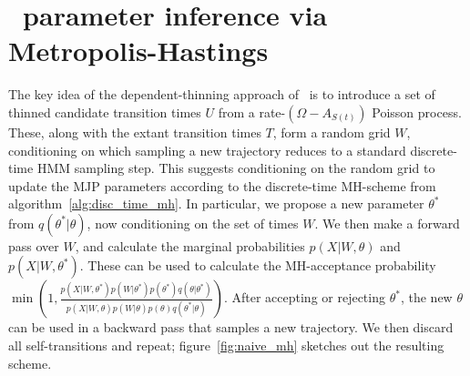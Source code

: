 \section{\Naive\ parameter inference via Metropolis-Hastings}

The key idea of the dependent-thinning approach of~\cite{RaoTeh13} is
to introduce a set of thinned candidate transition times $U$ from
a rate-$(\Omega-A_{S(t)})$ Poisson process. These, along 
with the extant transition times $T$, form a random grid $W$, conditioning on
which sampling a new trajectory reduces to a standard discrete-time 
HMM sampling step. This suggests conditioning on the random grid to update
the MJP parameters according to the discrete-time MH-scheme from
algorithm~\ref{alg:disc_time_mh}.
In particular, we propose a new parameter $\theta^*$ from $q(\theta^*|\theta)$, 
now conditioning on the set of times $W$.
We then make a forward pass over $W$, and calculate
the marginal probabilities $p(X|W,\theta)$ and $p(X|W,\theta^*)$. These can be
used to calculate the MH-acceptance probability $\min\left(1,
\frac{p(X|W,\theta^*)p(W|\theta^*)p(\theta^*)q(\theta|\theta^*)}
     {p(X|W,\theta)p(W|\theta)p(\theta)q(\theta^*|\theta)}\right)$. 
After accepting or rejecting $\theta^*$, the new $\theta$ can be used in
a backward pass that samples a new trajectory. We then discard all 
self-transitions and repeat; figure~\ref{fig:naive_mh} sketches out the resulting
scheme.

